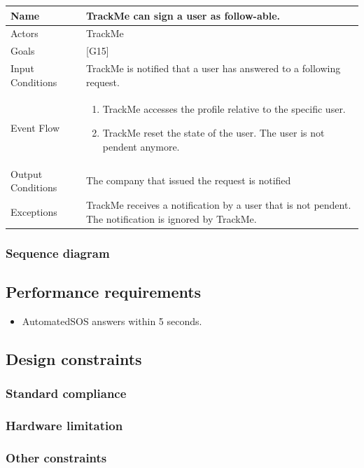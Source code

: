 \documentclass{article}
\begin{document}
\begin{center}
    \begin{tabular}{ | l | p{10cm} |}
    \hline
    Name & TrackMe can sign a user as follow-able. \\ \hline
    Actors & TrackMe\\ \hline
   	Goals & {[G15]}\\ \hline
    Input Conditions & TrackMe is notified that a user has answered to a following request.\\ \hline
    Event Flow & \begin{enumerate}
    	\item TrackMe accesses the profile relative to the specific user.
    	\item TrackMe reset the state of the user. The user is not pendent anymore.
    \end{enumerate} \\ \hline
    Output Conditions & The company that issued the request is notified \\ \hline
    Exceptions & TrackMe receives a notification by a user that is not pendent. The notification is ignored by TrackMe.\\ \hline
    \end{tabular}
\end{center}

\subsubsection{Sequence diagram}
\subsection{Performance requirements}
\begin{itemize}
	\item AutomatedSOS answers within 5 seconds.
\end{itemize}
\subsection{Design constraints}
\subsubsection{Standard compliance}
\subsubsection{Hardware limitation}
\subsubsection{Other constraints}
\end{document}
